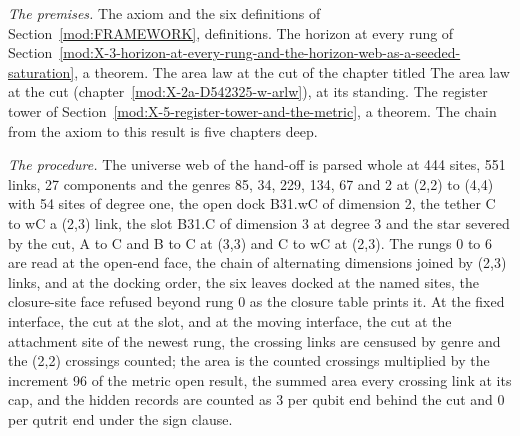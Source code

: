 \begin{chproof}
\textit{The premises.} The axiom and the six definitions of Section~\ref{mod:FRAMEWORK}, definitions. The horizon at every rung of Section~\ref{mod:X-3-horizon-at-every-rung-and-the-horizon-web-as-a-seeded-saturation}, a theorem. The area law at the cut of the chapter titled The area law at the cut (chapter~\ref{mod:X-2a-D542325-w-arlw}), at its standing. The register tower of Section~\ref{mod:X-5-register-tower-and-the-metric}, a theorem. The chain from the axiom to this result is five chapters deep.

\textit{The procedure.} The universe web of the hand-off is parsed whole at 444 sites, 551 links, 27 components and the genres 85, 34, 229, 134, 67 and 2 at (2,2) to (4,4) with 54 sites of degree one, the open dock B31.wC of dimension 2, the tether C to wC a (2,3) link, the slot B31.C of dimension 3 at degree 3 and the star severed by the cut, A to C and B to C at (3,3) and C to wC at (2,3). The rungs 0 to 6 are read at the open-end face, the chain of alternating dimensions joined by (2,3) links, and at the docking order, the six leaves docked at the named sites, the closure-site face refused beyond rung 0 as the closure table prints it. At the fixed interface, the cut at the slot, and at the moving interface, the cut at the attachment site of the newest rung, the crossing links are censused by genre and the (2,2) crossings counted; the area is the counted crossings multiplied by the increment 96 of the metric open result, the summed area every crossing link at its cap, and the hidden records are counted as 3 per qubit end behind the cut and 0 per qutrit end under the sign clause.


\end{chproof}
